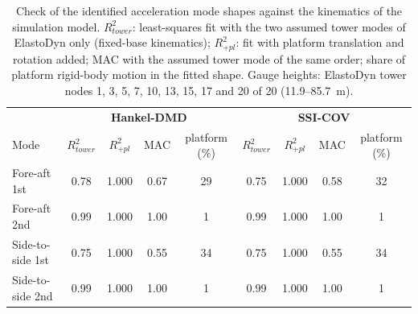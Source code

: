 \begin{table}[htbp]
\centering
\caption{Check of the identified acceleration mode shapes against the kinematics of the simulation model.
$R^2_{tower}$: least-squares fit with the two assumed tower modes of ElastoDyn only (fixed-base kinematics);
$R^2_{+pl}$: fit with platform translation and rotation added; MAC with the assumed tower mode of the same
order; share of platform rigid-body motion in the fitted shape. Gauge heights: ElastoDyn tower nodes 1, 3, 5, 7, 10, 13, 15, 17 and 20 of 20 (11.9--85.7~m).}
\label{tab:shape_check}
\footnotesize
\begin{tabular}{l cccc cccc}
\toprule
 & \multicolumn{4}{c}{\textbf{Hankel-DMD}} & \multicolumn{4}{c}{\textbf{SSI-COV}}\\
Mode & $R^2_{tower}$ & $R^2_{+pl}$ & MAC & platform (\%) & $R^2_{tower}$ & $R^2_{+pl}$ & MAC & platform (\%)\\
\midrule
Fore-aft 1st & 0.78 & 1.000 & 0.67 & 29 & 0.75 & 1.000 & 0.58 & 32\\
Fore-aft 2nd & 0.99 & 1.000 & 1.00 & 1 & 0.99 & 1.000 & 1.00 & 1\\
Side-to-side 1st & 0.75 & 1.000 & 0.55 & 34 & 0.75 & 1.000 & 0.55 & 34\\
Side-to-side 2nd & 0.99 & 1.000 & 1.00 & 1 & 0.99 & 1.000 & 1.00 & 1\\
\bottomrule
\end{tabular}
\end{table}
